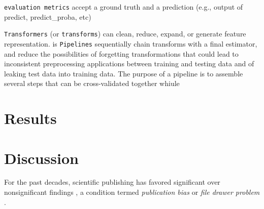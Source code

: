 \texttt{evaluation metrics} accept a ground truth and a prediction (e.g., output of predict, predict\_proba, etc)

\texttt{Transformers} (or \texttt{transforms}) can clean, reduce, expand, or generate feature representation.
 is
\texttt{Pipelines} sequentially chain transforms with a final estimator, and reduce the possibilities of forgetting transformations that could lead to inconsistent preprocessing applications between training and testing data and of leaking test data into training data. The purpose of a pipeline is to assemble several steps that can be cross-validated together whiule

\section{Results}
\pagebreak

\section{Discussion}
For the past decades, scientific publishing has favored significant over nonsignificant findings \citep{dwan2008systematic}, a condition termed \textit{publication bias} or \textit{file drawer problem} \citep{rosenthal1979file}.

